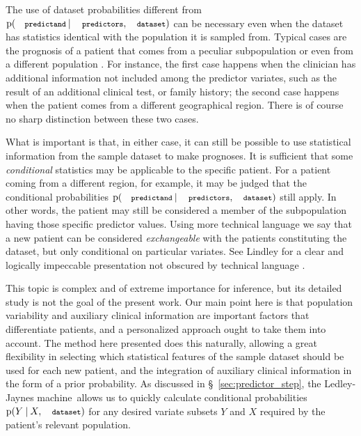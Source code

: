 \documentclass[utf8]{FrontiersinHarvard} %
\newcommand*{\sect}{\S}%
\newcommand*{\sects}{\S\S}%
\newcommand*{\chap}{ch.}%
\newcommand*{\p}{\mathrm{p}}%
\renewcommand*{\|}[1][]{\nonscript\:#1\vert\nonscript\:\mathopen{}}
\newcommand*{\predictors}{\texttt{\footnotesize predictors}}
\newcommand*{\predictand}{\texttt{\footnotesize predictand}}
\newcommand*{\dataset}{\texttt{\footnotesize dataset}}
\newcommand*{\ljm}{Ledley-Jaynes machine}
\begin{document}
\medskip

The use of dataset probabilities different from $\p(\predictand \| \predictors, \dataset)$ can be necessary even when the dataset has statistics identical with the population it is sampled from. Typical cases are the prognosis of a patient that comes from a peculiar subpopulation or even from a different population \citetext{\citealt{lindleyetal1981}; \citealt{quintanaetal2017}; \citealt[\chap~4]{soxetal1988_r2013}; \citealt[\chap~5]{huninketal2001_r2014}}. For instance, the first case happens when the clinician has additional information not included among the predictor variates, such as the result of an additional clinical test, or family history; the second case happens when the patient comes from a different geographical region. There is of course no sharp distinction between these two cases.

What is important is that, in either case, it can still be possible to use statistical information from the sample dataset to make prognoses. It is sufficient that some \emph{conditional} statistics may be applicable to the specific patient. For a patient coming from a different region, for example, it may be judged that the conditional probabilities $\p(\predictand \| \predictors, \dataset)$ still apply. In other words, the patient may still be considered a member of the subpopulation having those specific predictor values. Using more technical language we say that a new patient can be considered \emph{exchangeable} with the patients constituting the dataset, but only conditional on particular variates. See Lindley \citetext{\citeyear[especially around \sects~7.3, 8.6]{lindley2006_r2014}; \citeyear{lindleyetal1981}} for a clear and logically impeccable presentation not obscured by technical language \citetext{more technical references are \citealt[\sects~4.2--4.3, 4.6]{definetti1930,definetti1937,dawid2013,bernardoetal1994_r2000}; see also \citealt{malinasetal2004_r2016}, \citealt{sprengeretal2021} about confounding and Simpson's paradox, to which this topic is tightly related}.

This topic is complex and of extreme importance for inference, but its detailed study is not the goal of the present work. Our main point here is that population variability and auxiliary clinical information are important factors that differentiate patients, and a personalized approach ought to take them into account. The method here presented does this naturally, allowing a great flexibility in selecting which statistical features of the sample dataset should be used for each new patient, and the integration of auxiliary clinical information in the form of a prior probability. As discussed in \sect~\ref{sec:predictor_step}, the \ljm\ allows us to quickly calculate conditional probabilities $\p(Y\|X, \dataset)$ for any desired variate subsets $Y$ and $X$ required by the patient's relevant population.
\end{document}
